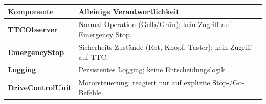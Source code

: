 \begin{center}
\renewcommand{\arraystretch}{1.3}
\begin{tabular}{>{\bfseries}p{4cm} p{9.5cm}}
  \toprule
  Komponente & Alleinige Verantwortlichkeit \\
  \midrule
  TTCObserver     & Normal Operation (Gelb/Grün); kein Zugriff auf Emergency Stop. \\
  EmergencyStop   & Sicherheits-Zustände (Rot, Knopf, Taster); kein Zugriff auf \ac{TTC}. \\
  Logging         & Persistentes Logging; keine Entscheidungslogik. \\
  DriveControlUnit & Motorsteuerung; reagiert nur auf explizite Stop-/Go-Befehle. \\
  \bottomrule
\end{tabular}
\end{center}

